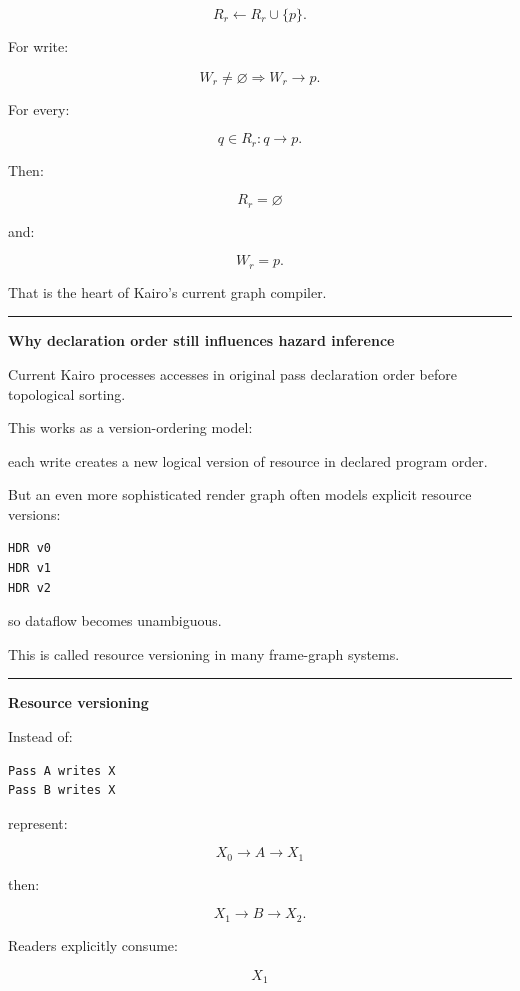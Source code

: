 \[
R_r\leftarrow
R_r\cup\{p\}.
\]

For write:

\[
W_r\neq\varnothing
\Rightarrow
W_r\rightarrow p.
\]

For every:

\[
q\in R_r:
q\rightarrow p.
\]

Then:

\[
R_r=\varnothing
\]

and:

\[
W_r=p.
\]

That is the heart of Kairo's current graph compiler.

\begin{center}\rule{0.5\linewidth}{0.5pt}\end{center}

\textbf{Why declaration order still influences hazard inference}

Current Kairo processes accesses in original pass declaration order before topological sorting.

This works as a version-ordering model:

each write creates a new logical version of resource in declared program order.

But an even more sophisticated render graph often models explicit resource versions:

\begin{verbatim}
HDR v0
HDR v1
HDR v2
\end{verbatim}

so dataflow becomes unambiguous.

This is called resource versioning in many frame-graph systems.

\begin{center}\rule{0.5\linewidth}{0.5pt}\end{center}

\textbf{Resource versioning}

Instead of:

\begin{verbatim}
Pass A writes X
Pass B writes X
\end{verbatim}

represent:

\[
X_0
\rightarrow
A
\rightarrow
X_1
\]

then:

\[
X_1
\rightarrow
B
\rightarrow
X_2.
\]

Readers explicitly consume:

\[
X_1
\]

